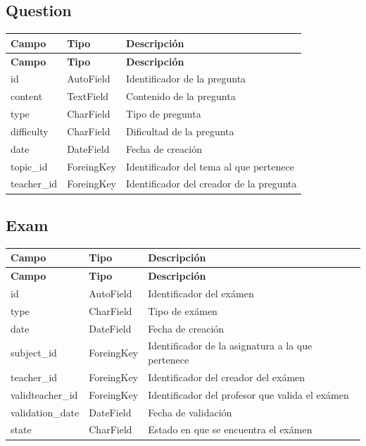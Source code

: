 \documentclass[a4paper,12pt]{article}
\begin{document}
\subsection{Question}
\begin{longtable}{| p{3cm} | p{3cm}|p{10cm}|}
	\hline
	\textbf{Campo} & \textbf{Tipo} & \textbf{Descripción} \\
	\hline
	\endfirsthead
	\hline
	\textbf{Campo} & \textbf{Tipo} & \textbf{Descripción} \\
	\hline
	\endhead
	\hline
	\endfoot
	\hline
	\endlastfoot
	
	id & AutoField & Identificador de la pregunta \\
	\hline
	content & TextField & Contenido de la pregunta \\
	\hline
	type & CharField & Tipo de pregunta\\
	\hline
	difficulty & CharField & Dificultad de la pregunta\\
	\hline
	date & DateField & Fecha de creación\\
	\hline
	topic\_id & ForeingKey & Identificador del tema al que pertenece\\
	\hline
	teacher\_id & ForeingKey & Identificador del creador de la pregunta\\
	
	\hline
\end{longtable}


\subsection{Exam}
\begin{longtable}{| p{3cm} | p{3cm}|p{10cm}|}
	\hline
	\textbf{Campo} & \textbf{Tipo} & \textbf{Descripción} \\
	\hline
	\endfirsthead
	\hline
	\textbf{Campo} & \textbf{Tipo} & \textbf{Descripción} \\
	\hline
	\endhead
	\hline
	\endfoot
	\hline
	\endlastfoot
	
	id & AutoField & Identificador del exámen \\
	\hline
	type & CharField & Tipo de exámen\\
	\hline
	date & DateField & Fecha de creación\\
	\hline
	subject\_id & ForeingKey & Identificador de la asignatura a la  que pertenece\\
	\hline
	teacher\_id & ForeingKey & Identificador del creador del exámen\\
	\hline
	validteacher\_id & ForeingKey & Identificador del profesor que valida el exámen\\
	\hline
	validation\_date & DateField & Fecha de validación\\
	\hline
	state & CharField & Estado en que se encuentra el exámen \\
	\hline
	
\end{longtable}
\end{document}
